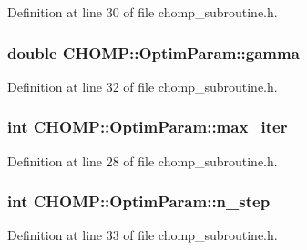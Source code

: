 Definition at line 30 of file chomp\+\_\+subroutine.\+h.

\subsubsection[{\texorpdfstring{gamma}{gamma}}]{\setlength{\rightskip}{0pt plus 5cm}double C\+H\+O\+M\+P\+::\+Optim\+Param\+::gamma}\hypertarget{struct_c_h_o_m_p_1_1_optim_param_a08dbedf3d695dd849e99972eeda4854a}{}\label{struct_c_h_o_m_p_1_1_optim_param_a08dbedf3d695dd849e99972eeda4854a}


Definition at line 32 of file chomp\+\_\+subroutine.\+h.

\subsubsection[{\texorpdfstring{max\+\_\+iter}{max_iter}}]{\setlength{\rightskip}{0pt plus 5cm}int C\+H\+O\+M\+P\+::\+Optim\+Param\+::max\+\_\+iter}\hypertarget{struct_c_h_o_m_p_1_1_optim_param_a0ede8f165be67dd3607e47fa90ed9c31}{}\label{struct_c_h_o_m_p_1_1_optim_param_a0ede8f165be67dd3607e47fa90ed9c31}


Definition at line 28 of file chomp\+\_\+subroutine.\+h.

\subsubsection[{\texorpdfstring{n\+\_\+step}{n_step}}]{\setlength{\rightskip}{0pt plus 5cm}int C\+H\+O\+M\+P\+::\+Optim\+Param\+::n\+\_\+step}\hypertarget{struct_c_h_o_m_p_1_1_optim_param_ac6dafdf330d8f879009f461a77b41c63}{}\label{struct_c_h_o_m_p_1_1_optim_param_ac6dafdf330d8f879009f461a77b41c63}


Definition at line 33 of file chomp\+\_\+subroutine.\+h.

